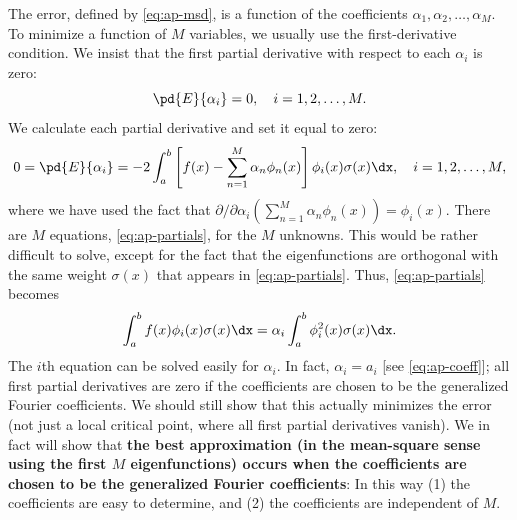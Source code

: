 The error, defined by \eqref{eq:ap-msd}, is a function of the coefficients $\alpha_1, \alpha_2, \ldots, \alpha_M$.  To minimize a function of $M$ variables, we usually use the first-derivative condition.  We insist that the first partial derivative with respect to each $\alpha_i$ is zero:
\[
\pd{E}{\alpha_i} = 0, \quad i = 1, 2, \ldots, M.
\]
We calculate each partial derivative and set it equal to zero:
\begin{equation}
\label{eq:ap-partials}
0 = \pd{E}{\alpha_i} = -2\int_a^b \left[f(x) - \sum_{n=1}^M \alpha_n\phi_n(x)\right]\phi_i(x)\sigma(x)\dx, \quad i = 1, 2, \ldots, M,
\end{equation}
where we have used the fact that $\partial/\partial\alpha_i(\sum_{n=1}^M \alpha_n\phi_n(x)) = \phi_i(x)$.  There are $M$ equations, \eqref{eq:ap-partials}, for the $M$ unknowns.  This would be rather difficult to solve, except for the fact that the eigenfunctions are orthogonal with the same weight $\sigma(x)$ that appears in \eqref{eq:ap-partials}.  Thus, \eqref{eq:ap-partials} becomes
\[
\int_a^b f(x)\phi_i(x)\sigma(x)\dx = \alpha_i\int_a^b \phi_i^2(x)\sigma(x)\dx.
\]
The $i$th equation can be solved easily for $\alpha_i$.  In fact, $\alpha_i = a_i$ [see \eqref{eq:ap-coeff}]; all first partial derivatives are zero if the coefficients are chosen to be the generalized Fourier coefficients.  We should still show that this actually minimizes the error (not just a local critical point, where all first partial derivatives vanish).  We in fact will show that \textbf{the best approximation (in the mean-square sense using the first $M$ eigenfunctions) occurs when the coefficients are chosen to be the generalized Fourier coefficients}: In this way (1) the coefficients are easy to determine, and (2) the coefficients are independent of $M$.


